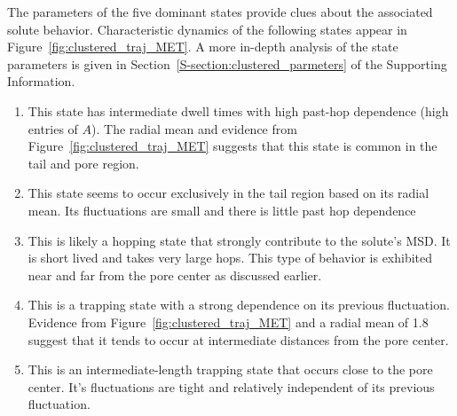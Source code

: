 \documentclass[journal=jpcbfk,manuscript=article]{achemso}
\begin{document}
  The parameters of the five dominant states provide clues about the associated solute
  behavior. Characteristic dynamics of the following states appear in 
  Figure~\ref{fig:clustered_traj_MET}. A more in-depth analysis of the state parameters
  is given in Section~\ref{S-section:clustered_parmeters} of the Supporting Information.
  \begin{enumerate}[label={State \theenumi :}, leftmargin=3.5\parindent]
     \item This state has intermediate dwell times with high past-hop dependence (high entries of $A$).
     The radial mean and evidence from Figure~\ref{fig:clustered_traj_MET} suggests
     that this state is common in the tail and pore region.
     \item This state seems to occur exclusively in the tail region based on its radial
     mean. Its fluctuations are small and there is little past hop dependence
     \item This is likely a hopping state that strongly contribute to the solute's MSD. 
     It is short lived and takes very large hops. This type of behavior is exhibited 
     near and far from the pore center as discussed earlier.
     \item This is a trapping state with a strong dependence on its previous fluctuation.
     Evidence from Figure~\ref{fig:clustered_traj_MET} and a radial mean of 1.8 suggest
     that it tends to occur at intermediate distances from the pore center.
     \item This is an intermediate-length trapping state that occurs close to the pore
     center. It's fluctuations are tight and relatively independent of its previous 
     fluctuation.
  \end{enumerate}
   
\end{document}
